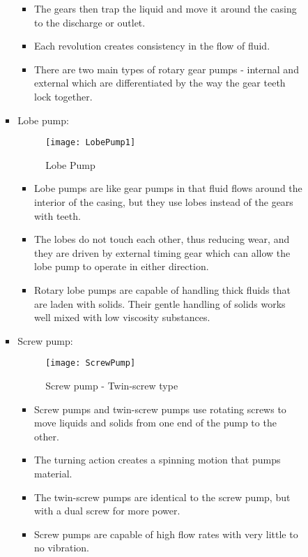\begin{itemize}
\begin{enumerate}
\begin{itemize}
\begin{itemize}
\begin{itemize}
\item The gears then trap the liquid and move it around the casing to the discharge or outlet. \item Each revolution creates consistency in the flow of fluid.
\item There are two main types of rotary gear pumps - internal and external which are differentiated by the way the gear teeth lock together.
\end{itemize}
\item Lobe pump: 
\begin{figure}[h]
\begin{center}
\texttt{[image: LobePump1]}
\caption{Lobe Pump}
\end{center}
\end{figure}
\begin{itemize}
\item Lobe pumps are like gear pumps in that fluid flows around the interior of the casing, but they use lobes instead of the gears with teeth. 
\item The lobes do not touch each other, thus reducing wear, and they are driven by external timing gear which can allow the lobe pump to operate in either direction.
\item Rotary lobe pumps are capable of handling thick fluids that are laden with solids. Their gentle handling of solids works well mixed with low viscosity substances.
\end{itemize}
\item Screw pump: 
\begin{figure}[h]
\begin{center}
\texttt{[image: ScrewPump]}
\caption{Screw pump - Twin-screw type}
\end{center}
\end{figure}
\begin{itemize}
\item Screw pumps and twin-screw pumps use rotating screws to move liquids and solids from one end of the pump to the other. 
\item The turning action creates a spinning motion that pumps material. 
\item The twin-screw pumps are identical to the screw pump, but with a dual screw for more power. \item Screw pumps are capable of high flow rates with very little to no vibration.
\end{itemize}
\end{itemize}
\end{itemize}

\end{enumerate}
\end{itemize}
